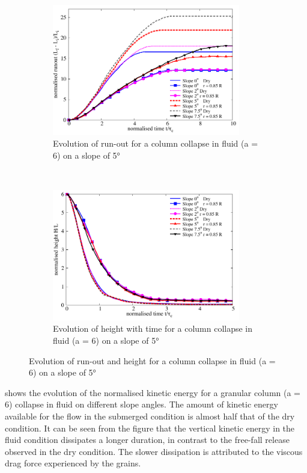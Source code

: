 \begin{figure}
\centering
\begin{subfigure}[t]{0.9\textwidth}
\includegraphics[width=0.9\textwidth]{Runout_a6_slope}
\caption{Evolution of run-out for a column collapse in fluid (a = 6) on a 
slope of 5\si{\degree}}
\label{fig:Runout_a6_slope}
\end{subfigure} \\
\begin{subfigure}[t]{0.9\textwidth}
\centering
\includegraphics[width=0.9\textwidth]{Height_a6_slope}
\caption{Evolution of height with time for a column collapse in fluid (a = 6) 
on a slope of 5\si{\degree}}
\label{fig:Height_a6_slope}
\end{subfigure}
\caption{Evolution of  run-out and height  for a column collapse in fluid (a = 
6) on a slope of 5\si{\degree}}
\label{fig:a6_slope}
\end{figure}

 shows the evolution of the normalised kinetic energy 
for a granular column (a = 6) collapse in fluid on different slope angles. The 
amount of kinetic energy available for the flow in the submerged condition 
is almost half that of the dry condition. It can be seen from the figure that 
the vertical kinetic energy in the fluid condition dissipates a longer 
duration, in contrast to the free-fall release observed in the dry condition. 
The slower dissipation is attributed to the viscous drag force experienced by 
the grains. 


